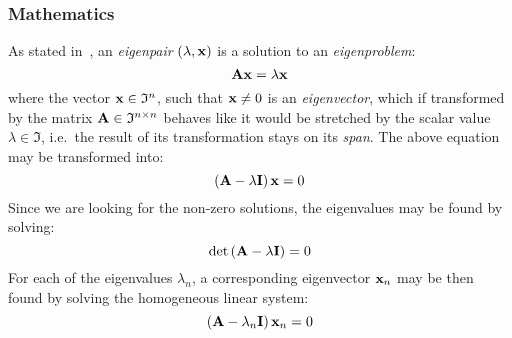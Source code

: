 \subsubsection*{Mathematics}
As stated in~\cite{Zarowski,Zdunek}, an \textit{eigenpair} $(\lambda, \mathbf{x})$ is a
solution to an \textit{eigenproblem}:
\begin{equation*}
    \mathbf{A}\mathbf{x} = \lambda\mathbf{x}
\end{equation*}
where the vector $\mathbf{x}\in\mathfrak{I}^n$, such that $\mathbf{x}\neq0$ is an
\textit{eigenvector}, which if transformed by the matrix
$\mathbf{A}\in\mathfrak{I}^{n\times{}n}$ behaves like it would be stretched by the scalar
value $\lambda\in\mathfrak{I}$, i.e.~the result of its transformation stays on its
\textit{span}.
The above equation may be transformed into:
\begin{equation*}
    \left(\mathbf{A} - \lambda\mathbf{I}\right)\mathbf{x} = 0
\end{equation*}
Since we are looking for the non-zero solutions, the eigenvalues may be found by
solving:
\begin{equation}
    \label{eq:eigen_value}
    \det{\left(\mathbf{A} - \lambda\mathbf{I}\right)} = 0
\end{equation}
For each of the eigenvalues $\lambda_n$, a corresponding eigenvector $\mathbf{x}_n$ may be
then found
by solving the homogeneous linear system:
\begin{equation}
    \label{eq:eigen_vector}
    \left(\mathbf{A} - \lambda_n\mathbf{I}\right)\mathbf{x}_n = 0
\end{equation}
